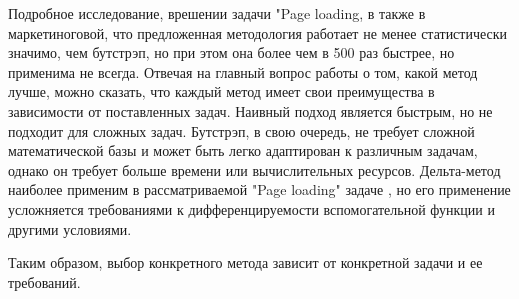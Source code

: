 \documentclass[specialist,
               substylefile = spbu_report.rtx,
               subf,href,colorlinks=true, 12pt]{disser}
\begin{document}
Подробное исследование, врешении задачи "Page loading, в также в маркетиноговой, что предложенная методология работает не менее статистически значимо, чем бутстрэп, но при этом она более чем в 500 раз быстрее, но применима не всегда.
Отвечая на главный вопрос работы о том, какой метод лучше, можно сказать, что каждый метод имеет свои преимущества в зависимости от поставленных задач. Наивный подход является быстрым, но не подходит для сложных задач. Бутстрэп, в свою очередь, не требует сложной математической базы и может быть легко адаптирован к различным задачам, однако он требует больше времени или вычислительных ресурсов. Дельта-метод наиболее применим в рассматриваемой "Page loading" задаче , но его применение усложняется требованиями к дифференцируемости вспомогательной функции и другими условиями.

Таким образом, выбор конкретного метода зависит от конкретной задачи и ее требований.

\newpage
\end{document}
